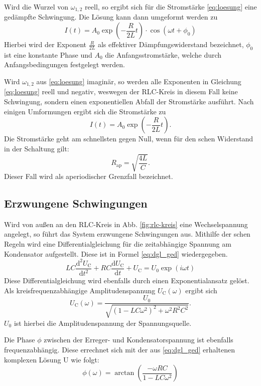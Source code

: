 Wird die Wurzel von $\omega_{1,2}$ reell, so ergibt sich für die Stromstärke \eqref{eq:loesung} eine gedämpfte Schwingung. Die Lösung kann dann umgeformt werden zu
\begin{equation}
\label{eq:loesung_ged}
I(t) = A_0 \exp\left({-\frac{R}{2L}t}\right) \cdot \cos({\omega t + \phi_0})
\end{equation}
Hierbei wird der Exponent $\frac{R}{2L}$ als effektiver Dämpfungswiderstand bezeichnet, $\phi_0$ ist eine konstante Phase und $A_0$ die Anfangsstromstärke, welche durch Anfangsbedingungen festgelegt werden.

Wird $\omega_{1,2}$ aus \eqref{eq:loesung} imaginär, so werden alle Exponenten in Gleichung \eqref{eq:loesung} reell und negativ, weswegen der RLC-Kreis in diesem Fall keine Schwingung, sondern einen exponentiellen Abfall der Stromstärke ausführt.
Nach einigen Umformungen ergibt sich die Stromstärke zu
\begin{equation}
\label{eq:loesung_ged}
I(t) = A_0 \exp\left({-\frac{R}{2L}t}\right).
\end{equation}
Die Stromstärke geht am schnellsten gegen Null, wenn für den schen Widerstand in der Schaltung gilt:
\begin{equation}
\label{eq:rap}
R_{\text{ap}} = \sqrt{\frac{4L}{C}}.
\end{equation}
Dieser Fall wird als aperiodischer Grenzfall bezeichnet.

\subsection{Erzwungene Schwingungen}
Wird von außen an den RLC-Kreis in Abb. \ref{fig:rlc-kreis} eine Wechselspannung angelegt, so führt das System erzwungene Schwingungen aus.
Mithilfe der schen Regeln wird eine Differentialgleichung für die zeitabhängige Spannung am Kondensator aufgestellt. Diese ist in Formel \eqref{eq:dgl_ged} wiedergegeben.
\begin{equation}
\label{eq:dgl_ged}
LC \frac{\text{d}^2 U_\text{C}}{\text{d}t^2} + RC \frac{\text{d}U_\text{C}}{\text{d}t} + U_\text{C} = U_0 \exp({i\omega t})
\end{equation}
Diese Differentialgleichung wird ebenfalls durch einen Exponentialansatz gelöst. Als kreisfrequenzabhängige Amplitudenspannung $U_\text{C}(\omega)$ ergibt sich
\begin{equation}
\label{eq:amplitude_freq}
U_\text{C}(\omega) = \frac{U_0}{ \sqrt{ (1 - LC \omega^2)^2 + \omega^2 R^2 C^2  }}.
\end{equation}
$U_0$ ist hierbei die Amplitudenspannung der Spannungsquelle.

Die Phase $\phi$ zwischen der Erreger- und Kondensatorspannung ist ebenfalls frequenzabhängig. Diese errechnet sich mit der aus \eqref{eq:dgl_ged} erhaltenen komplexen Lösung U wie folgt:
\begin{equation}
\label{eq:phase_freq}
\phi(\omega) = \arctan{\left(\frac{-\omega R C}{1 - LC \omega^2}\right)}
\end{equation}
